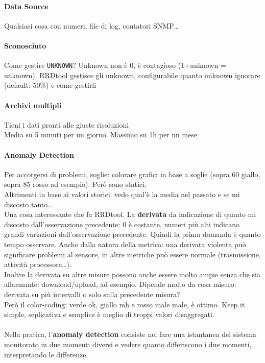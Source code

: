 \documentclass[10pt]{book}
\begin{document}
\paragraph{Data Source} Qualsiasi cosa con numeri, file di log, contatori SNMP\ldots
\paragraph{Sconosciuto} Come gestire \texttt{UNKNOWN}? Unknown non è 0, è contagioso (1+unknown = unknown). RRDtool gestisce gli unknown, configurabile quanto unknown ignorare (default: 50\%) e come gestirli
\paragraph{Archivi multipli} Tieni i dati pronti alle giuste risoluzioni\\
Media su 5 minuti per un giorno.
Massimo su 1h per un mese
\paragraph{Anomaly Detection} Per accorgersi di problemi, soglie: colorare grafici in base a soglie (sopra 60 giallo, sopra 85 rosso ad esempio). Però sono statici.\\
Altrimenti in base ai valori storici: vedo qual'è la media nel passato e se mi discosto tanto\ldots\\
Una cosa interessante che fa RRDtool. La \textbf{derivata} da indicazione di quanto mi discosto dall'osservazione precedente: 0 è costante, numeri più alti indicano grandi variazioni dall'osservazione precedente. Quindi la prima domanda è quanto tempo osservare. Anche dalla natura della metrica: una derivata violenta può significare problemi al sensore, in altre metriche può essere normale (trasmissione, attività processore\ldots).\\
Inoltre la derivata su altre misure possono anche essere molto ampie senza che sia allarmante: download/upload, ad esempio. Dipende molto da cosa misuro: derivata su più intervalli o solo sulla precedente misura?\\
Però il color-coding: verde ok, giallo mh e rosso male male, è ottimo. Keep it simple, seplicativa e semplice è meglio di troppi valori disaggregati.\\\\
Nella pratica, l'\textbf{anomaly detection} consiste nel fare una istantanea del sistema monitorato in due momenti diversi e vedere quanto differiscono i due momenti, interpretando le differenze.
\end{document}
